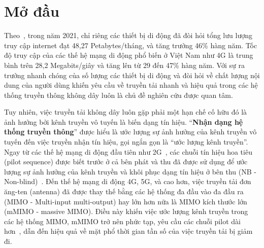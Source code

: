 \clearpage
{}

\chapter*{Mở đầu}
\label{sec:intro}


Theo~\cite{Mtawa2019}, trong năm 2021, chỉ riêng các thiết bị di động đã đòi hỏi tổng lưu lượng truy cập internet đạt 48,27 Petabytes/tháng, và tăng trưởng 46\% hàng năm. Tốc độ truy cập của các thế hệ mạng di động phổ biến ở Việt Nam như 4G là trung bình trên 28,2 Megabits/giây và tăng lên từ 29 đến 47\% hàng năm. Với sự ra trưởng nhanh chóng của số lượng các thiết bị di động và đòi hỏi về chất lượng nội dung của người dùng khiến yêu cầu về truyền tải nhanh và hiệu quả trong các hệ thống truyền thông không dây luôn là chủ đề nghiên cứu được quan tâm.

Tuy nhiên, việc truyền tải không dây luôn gặp phải một hạn chế cố hữu đó là ảnh hưởng bởi kênh truyền vô tuyến là biến dạng tín hiệu.
``\textbf{Nhận dạng hệ thống truyền thông}'' được hiểu là ước lượng sự ảnh hưởng của kênh truyền vô tuyến đến việc truyền nhận tín hiệu, gọi ngắn gọn là ``ước lượng kênh truyền''.
Ngay từ các thế hệ mạng di động đầu tiên như 2G~\cite{Tse2005}, các chuỗi tín hiệu hoa tiêu (pilot sequence) được biết trước ở cả bên phát và thu đã được sử dụng để ước lượng sự ảnh hưởng của kênh truyền và khôi phục dạng tín hiệu ở bên thu (NB - Non-blind)~\cite{ljung1999system}. Đến thế hệ mạng di động 4G, 5G, và cao hơn, việc truyền tải đơn ăng-ten (antenna) đã được thay thế bằng các hệ thống đa đầu vào đa đầu ra (MIMO - Multi-input multi-output) hay lớn hơn nữa là MIMO kích thước lớn (mMIMO - massive MIMO). Điều này khiến việc ước lượng kênh truyền trong các hệ thống MIMO, mMIMO trở nên phức tạp, yêu cầu các chuỗi pilot dài hơn~\cite{Michelusi2009}, dẫn đến hiệu quả về mặt phổ thời gian tần số của việc truyền tải bị giảm đi. 

